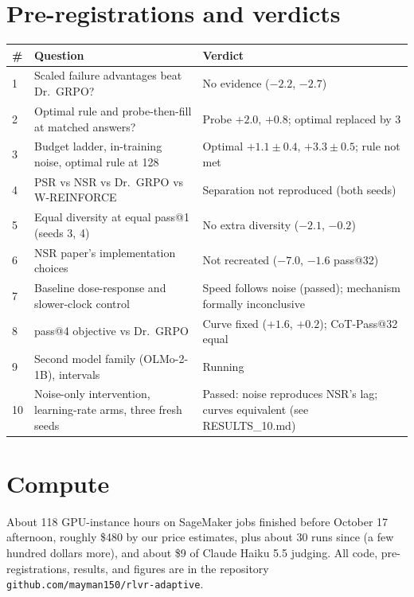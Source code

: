 \documentclass[11pt]{article}
\begin{document}
\section{Pre-registrations and verdicts}
\begin{table}[H]
\centering\small
\begin{tabularx}{\linewidth}{@{}lYl@{}}
\toprule
\textbf{\#} & \textbf{Question} & \textbf{Verdict}\\
 & Scaled failure advantages beat Dr.\ GRPO? & No evidence ($-2.2$, $-2.7$)\\
2 & Optimal rule and probe-then-fill at matched answers? & Probe $+2.0$, $+0.8$; optimal replaced by 3\\
3 & Budget ladder, in-training noise, optimal rule at 128 & Optimal $+1.1\pm0.4$, $+3.3\pm0.5$; rule not met\\
4 & PSR vs NSR vs Dr.\ GRPO vs W-REINFORCE & Separation not reproduced (both seeds)\\
5 & Equal diversity at equal pass@1 (seeds 3, 4) & No extra diversity ($-2.1$, $-0.2$)\\
6 & NSR paper's implementation choices & Not recreated ($-7.0$, $-1.6$ pass@32)\\
7 & Baseline dose-response and slower-clock control & Speed follows noise (passed); mechanism formally inconclusive\\
8 & pass@4 objective vs Dr.\ GRPO & Curve fixed ($+1.6$, $+0.2$); CoT-Pass@32 equal\\
9 & Second model family (OLMo-2-1B), intervals & Running\\
10 & Noise-only intervention, learning-rate arms, three fresh seeds & Passed: noise reproduces NSR's lag; curves equivalent (see RESULTS\_10.md)\\
\bottomrule
\end{tabularx}
\end{table}

\section{Compute}
About 118 GPU-instance hours on SageMaker jobs finished before October 17 afternoon, roughly \$480 by our price estimates, plus about 30 runs since (a few hundred dollars more), and about \$9 of Claude Haiku 5.5 judging. All code, pre-registrations, results, and figures are in the repository \texttt{github.com/mayman150/rlvr-adaptive}.
\end{document}
